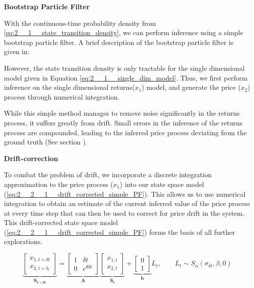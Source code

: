 \documentclass[../main.tex]{subfiles}
\begin{document}

\textbf{Bootstrap Particle Filter}

With the continuous-time probability density from \autoref{eq:2__1__state_transition_density}, we can perform inference using a simple bootstrap particle filter. A brief description of the bootstrap particle filter is given in: 

However, the state transition density is only tractable for the single dimensional model given in Equation \autoref{eq:2__1__single_dim_model}. Thus, we first perform inference on the single dimensional returns($x_1$) model, and generate the price ($x_2$) process through numerical integration. 

While this simple method manages to remove noise significantly in the returns process, it suffers greatly from drift. Small errors in the inference of the returns process are compounded, leading to the inferred price process deviating from the ground truth (See section ).

\textbf{Drift-correction}

To combat the problem of drift, we incorporate a discrete integration approximation to the price process ($x_1$) into our state space model (\autoref{eq:2__2__1__drift_corrected_simple_PF}). This allows us to use numerical integration to obtain an estimate of the current inferred value of the price process at every time step that can then be used to correct for price drift in the system. This drift-corrected state space model (\autoref{eq:2__2__1__drift_corrected_simple_PF}) forms the basis of all further explorations.

\begin{equation}
    \underbrace{
        \begin{bmatrix}
        x_{1,t+\delta t} \\ x_{2,t + \delta_t}
        \end{bmatrix}
    }_{\mathbf{S_{t + \delta t}}}
     =
    \underbrace{
        \begin{bmatrix}
        1 & \delta t \\ 0 & e^{\theta \delta t}
        \end{bmatrix}
    }_{\mathbf{A}}
    \underbrace{
        \begin{bmatrix}
        x_{1,t} \\ x_{2,t}
        \end{bmatrix}
    }_{\mathbf{S_t}}
    + 
    \underbrace{
        \begin{bmatrix}
        0 \\ 1
        \end{bmatrix}
    }_{\mathbf{b}} L_t, \qquad  L_t \sim S_\alpha (\sigma_{\delta t}, \beta, 0)
    \label{eq:2__2__1__drift_corrected_simple_PF}
\end{equation}
\end{document}
